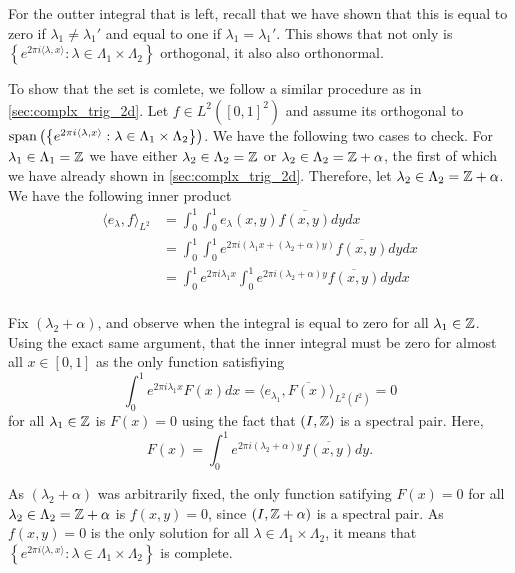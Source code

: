 \documentclass[../thesis.tex]{subfiles}
\begin{document}
For the outter integral that is left, recall that we have shown that this is equal to zero if $\lambda_1\neq\lambda_1'$ and equal to one if $\lambda_1 = \lambda_1'$. This shows that not only is $\left\{ e^{2\pi i \langle \lambda,x  \rangle } : \lambda \in \Lambda_1\times\Lambda_2\right\}$ orthogonal, it also also orthonormal. 


To show that the set is comlete, we follow a similar procedure as in \cref{sec:complx_trig_2d}. Let $f\in L^2([0,1]^2)$ and assume its orthogonal to $\operatorname{span}\left( \left\{ e^{2\pi i \langle \lambda,x  \rangle } : \lambda \in \Lambda_1\times\Lambda_2\right\} \right)$. We have the following two cases to check. For $\lambda_1\in\Lambda_1=\mathbb{Z}$ we have either $\lambda_2\in \Lambda_2=\mathbb{Z}$ or $\lambda_2\in \Lambda_2=\mathbb{Z}+\alpha$, the first of which we have already shown in \cref{sec:complx_trig_2d}. Therefore, let $\lambda_2\in \Lambda_2=\mathbb{Z}+\alpha$. We have the following inner product
\begin{align*}
    \langle e_\lambda, f \rangle_{L^2} 
    &= \int_0^1 \int_0^1 e_\lambda(x,y) \overline{f(x,y)} dydx \\   &= \int_0^1 \int_0^1 e^{2\pi i  (\lambda_1x + (\lambda_2+\alpha) y)} \overline{f(x,y)} dydx \\
    &= \int_0^1 e^{2 \pi i \lambda_1 x}\int_0^1 e^{2 \pi i (\lambda_2+\alpha) y} \overline{f(x,y)} dydx \\
\end{align*}

Fix $(\lambda_2+\alpha)$, and observe when the integral is equal to zero for all $\lambda_1\in \mathbb{Z}$. Using the exact same argument, that the inner integral must be zero for almost all $x\in[0,1]$ as the only function satisfiying 
\begin{equation*}
    \int_0^1 e^{2 \pi i \lambda_1 x} F(x)dx = \langle e_{\lambda_1}, \overline{F(x)}\rangle_{L^2(I^2)} = 0
\end{equation*}
for all $\lambda_1 \in \mathbb{Z}$ is $F(x)=0$ using the fact that $(I,\mathbb{Z})$ is a spectral pair. Here,
\begin{equation*}
    F(x) = \int_0^1 e^{2 \pi i (\lambda_2+\alpha) y} \overline{f(x,y)} dy.
\end{equation*}

As $(\lambda_2+\alpha)$ was arbitrarily fixed, the only function satifying $F(x) = 0 $ for all $\lambda_2 \in \Lambda_2=\mathbb{Z}+\alpha$ is $f(x,y)=0$, since $\left(I, \mathbb{Z}+\alpha\right)$ is a spectral pair. As $f(x,y)=0$ is the only solution for all $\lambda \in \Lambda_1 \times \Lambda_2$, it means that $\left\{ e^{2\pi i \langle \lambda,x  \rangle } : \lambda \in \Lambda_1\times\Lambda_2\right\}$ is complete. 
\end{document}
